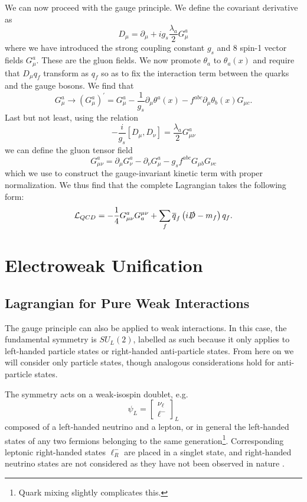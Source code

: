 \documentclass[10pt,a4paper]{book}
\begin{document}
We can now proceed with the gauge principle. We define the covariant derivative as
\begin{equation}
D_\mu = \partial_\mu +ig_s\frac{\lambda_a}{2}G^a_\mu
\end{equation}
where we have introduced the strong coupling constant $g_s$ and 8 spin-1 vector fields $G^a_\mu$. These are the gluon fields.
We now promote $\theta_a$ to $\theta_a(x)$ and require that $D_\mu q_f$ transform as $q_f$ so as to fix the interaction term between the quarks and the gauge bosons. We find that
\begin{equation}
G^a_\mu \rightarrow (G^a_\mu)^\prime = G^a_\mu - \frac{1}{g_s}\partial_\mu\theta^a(x) - f^{abc}\partial_\mu\theta_b(x)G_{\mu c}.
\end{equation}
Last but not least, using the relation
\begin{equation}
-\frac{i}{g_s}[D_\mu, D_\nu] =  \frac{\lambda_a}{2}G^a_{\mu \nu}
\end{equation}
we can define the gluon tensor field
\begin{equation}
G^a_{\mu\nu} = \partial_\mu G^a_\nu - \partial_\nu G^a_\mu - g_s f^{abc}G_{\mu b}G_{\nu c}
\end{equation}
which we use to construct the gauge-invariant kinetic term with proper normalization.
We thus find that the complete Lagrangian takes the following form:
\begin{equation}
\mathcal{L}_{QCD} = -\frac{1}{4}G^a_{\mu\nu}G^{\mu\nu}_a + \sum_f\overline{q}_f\left(i\slashed{D} - m_f\right)q_f.
\end{equation}

\section{Electroweak Unification}
\subsection{Lagrangian for Pure Weak Interactions}
The gauge principle can also be applied to weak interactions. In this case, the fundamental symmetry is $SU_L(2)$, labelled as such because it only applies to left-handed particle states or right-handed anti-particle states. From here on we will consider only particle states, though analogous considerations hold for anti-particle states. 

The symmetry acts on a weak-isospin doublet, e.g.\
\begin{equation}
\label{weak doublet}
\psi_L = \begin{bmatrix}
\nu_\ell \\
\ell^-
\end{bmatrix}_L
\end{equation}
composed of a left-handed neutrino and a lepton, or in general the left-handed states of any two fermions belonging to the same generation\footnote{Quark mixing slightly complicates this.}. Corresponding leptonic right-handed states $\ell^-_R$ are placed in a singlet state, and right-handed neutrino states are not considered as they have not been observed in nature \cite{PhysRev.109.1015}.
\end{document}
